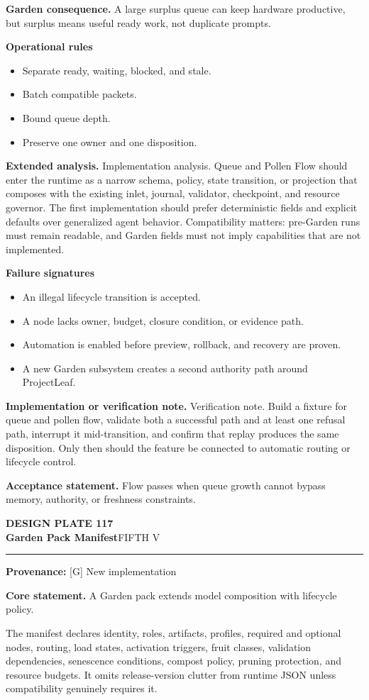 \documentclass[10pt,letterpaper,oneside]{article}
\newcommand{\prov}[1]{\textcolor{gardenBlue}{\sffamily\footnotesize\textbf{Provenance:} #1}}
\newcommand{\platetitle}[3]{%
  \begin{minipage}[t][0.54in][t]{\textwidth}
  {\sffamily\bfseries\color{gardenDeep}\fontsize{9}{10}\selectfont DESIGN PLATE #1}\\[-1pt]
  {\sffamily\bfseries\color{gardenInk}\fontsize{16.5}{18}\selectfont #2}\hfill{\sffamily\color{gardenGreen}\large #3}
  \end{minipage}\vspace{-2pt}\hrule\vspace{5pt}}
\begin{document}
\textbf{Garden consequence.} A large surplus queue can keep hardware productive, but surplus means useful ready work, not duplicate prompts.

\textbf{Operational rules}
\begin{itemize}
\item Separate ready, waiting, blocked, and stale.
\item Batch compatible packets.
\item Bound queue depth.
\item Preserve one owner and one disposition.
\end{itemize}
\textbf{Extended analysis.} Implementation analysis. Queue and Pollen Flow should enter the runtime as a narrow schema, policy, state transition, or projection that composes with the existing inlet, journal, validator, checkpoint, and resource governor. The first implementation should prefer deterministic fields and explicit defaults over generalized agent behavior. Compatibility matters: pre-Garden runs must remain readable, and Garden fields must not imply capabilities that are not implemented.

\textbf{Failure signatures}
\begin{itemize}
\item An illegal lifecycle transition is accepted.
\item A node lacks owner, budget, closure condition, or evidence path.
\item Automation is enabled before preview, rollback, and recovery are proven.
\item A new Garden subsystem creates a second authority path around ProjectLeaf.
\end{itemize}
\textbf{Implementation or verification note.} Verification note. Build a fixture for queue and pollen flow, validate both a successful path and at least one refusal path, interrupt it mid-transition, and confirm that replay produces the same disposition. Only then should the feature be connected to automatic routing or lifecycle control.

\begin{acceptbox}
\textbf{Acceptance statement.} Flow passes when queue growth cannot bypass memory, authority, or freshness constraints.
\end{acceptbox}
\newpage
\platetitle{117}{Garden Pack Manifest}{FIFTH V}
\prov{[G] New implementation}
\fontsize{8.85}{10.45}\selectfont
\begin{corebox}
\textbf{Core statement.} A Garden pack extends model composition with lifecycle policy.
\end{corebox}
The manifest declares identity, roles, artifacts, profiles, required and optional nodes, routing, load states, activation triggers, fruit classes, validation dependencies, senescence conditions, compost policy, pruning protection, and resource budgets. It omits release-version clutter from runtime JSON unless compatibility genuinely requires it.
\end{document}
